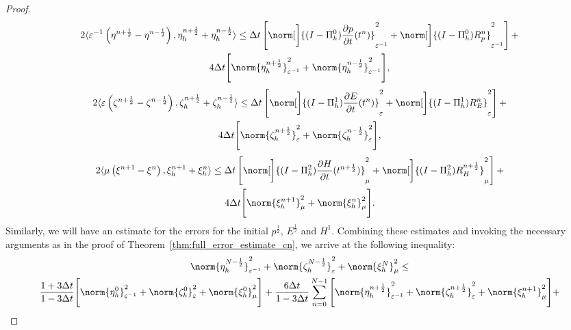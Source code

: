 \documentclass{amsart}
\theoremstyle{thmstyleone}%
\theoremstyle{thmstyletwo}%
\theoremstyle{thmstylethree}%
\newcommand{\ainnerproduct}[2]{\langle #1, #2 \rangle}
\begin{document}
\begin{proof}
\begin{multline*}
  2 \ainnerproduct{\varepsilon^{-1} \left( \eta^{n + \frac{1}{2}} - \eta^{n -\frac{1}{2}} \right)}{\eta^{n + \frac{1}{2}}_h + \eta_h^{n - \frac{1}{2}}} \le \Delta t \left[ \norm[\bigg]{(I - \Pi_h^0) \dfrac{\partial p}{\partial t}(t^n)}^2_{\varepsilon^{-1}} + \norm[\bigg]{(I - \Pi_h^0) R_p^n}^2_{\varepsilon^{-1}} \right] + \\
  4 \Delta t \Bigg[ \norm{\eta_h^{n + \frac{1}{2}}}^2_{\varepsilon^{-1}} +\norm{\eta_h^{n - \frac{1}{2}}}^2_{\varepsilon^{-1}} \Bigg],
\end{multline*}
\vspace{-1em} \begin{multline*}
  2 \ainnerproduct{\varepsilon \left(\zeta^{n + \frac{1}{2}} - \zeta^{n - \frac{1}{2}} \right)}{\zeta^{n + \frac{1}{2}}_h + \zeta_h^{n - \frac{1}{2}}} \le \Delta t \left[ \norm[\bigg]{(I - \Pi_h^1) \dfrac{\partial E}{\partial t}(t^n)}^2_{\varepsilon} + \norm[\bigg]{(I - \Pi_h^1) R_E^n}^2_{\varepsilon} \right] + \\
  4 \Delta t \Bigg[ \norm{\zeta_h^{n + \frac{1}{2}}}^2_{\varepsilon} +\norm{\zeta_h^{n - \frac{1}{2}}}^2_{\varepsilon} \Bigg],
\end{multline*}
\vspace{-1em} \begin{multline*}
  2 \ainnerproduct{\mu \left(\xi^{n + 1} - \xi^{n}\right)}{\xi^{n + 1}_h + \xi^n_h} \le \Delta t  \left[ \norm[\bigg]{(I - \Pi_h^2) \dfrac{\partial H}{\partial t}(t^{n + \frac{1}{2}})}^2_\mu + \norm[\bigg]{(I - \Pi_h^2) R_H^{n + \frac{1}{2}}}^2_{\mu} \right] + \\
  4 \Delta t \Bigg[ \norm{\xi_h^{n + 1}}^2_{\mu} + \norm{\xi_h^n}^2_{\mu} \Bigg].
\end{multline*}
Similarly, we will have an estimate for the errors for the initial $p^{\frac{1}{2}}$, $E^{\frac{1}{2}}$ and $H^1$. Combining these estimates and invoking the necessary arguments as in the proof of Theorem~\ref{thm:full_error_estimate_cn}, we arrive at the following inequality:
\begin{multline*}
  \norm{\eta_h^{N - \frac{1}{2}}}^2_{\varepsilon^{-1}} + \norm{\zeta_h^{N - \frac{1}{2}}}^2_{\varepsilon} + \norm{\xi_h^N}^2_{\mu} \le \\
  \dfrac{1 + 3 \Delta t}{1 - 3 \Delta t} \Bigg[ \norm{\eta_h^0}^2_{\varepsilon^{-1}} + \norm{\zeta_h^0}^2_{\varepsilon} + \norm{\xi_h^0}^2_{\mu} \Bigg] + \dfrac{6 \Delta t}{1 - 3\Delta t} \sum\limits_{n = 0}^{N - 1} \Bigg[ \norm{\eta_h^{n + \frac{1}{2}}}^2_{\varepsilon^{-1}} + \norm{\zeta_h^{n + \frac{1}{2}}}^2_{\varepsilon} +  \norm{\xi_h^{n + 1}}^2_{\mu} \Bigg] + \\

\end{multline*}
\end{proof}
\end{document}
